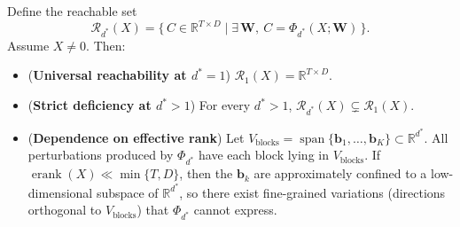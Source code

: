 \documentclass[sigconf,screen]{acmart}
\begin{document}
\begin{theorem}
\label{thm:expressivity}
Define the reachable set
\[
\mathcal R_{d^{\ast}}(X)
=\bigl\{\,C\in\mathbb R^{T\times D}\mid \exists\,\mathbf W,\ 
C=\Phi_{d^{\ast}}(X;\mathbf W)\,\bigr\}.
\]
Assume \(X\neq 0\). Then:
\begin{itemize}[leftmargin=15pt,parsep=2pt,itemsep=2pt,topsep=2pt]
  \item[(i)] (\textbf{Universal reachability at \(d^{\ast}=1\)}) \(\mathcal R_1(X)=\mathbb R^{T\times D}\).
  \item[(ii)] (\textbf{Strict deficiency at \(d^{\ast}>1\)}) For every \(d^{\ast}>1\), \(\mathcal R_{d^{\ast}}(X)\subsetneq\mathcal R_1(X)\).
  \item[(iii)] (\textbf{Dependence on effective rank}) Let \(V_{\mathrm{blocks}}=\operatorname{span}\{\mathbf b_1,\dots,\mathbf b_K\}\subset\mathbb R^{d^{\ast}}\). All perturbations produced by \(\Phi_{d^{\ast}}\) have each block lying in \(V_{\mathrm{blocks}}\). If \(\operatorname{erank}(X)\ll\min\{T,D\}\), then the \(\mathbf b_k\) are approximately confined to a low-dimensional subspace of \(\mathbb R^{d^{\ast}}\), so there exist fine-grained variations (directions orthogonal to \(V_{\mathrm{blocks}}\)) that \(\Phi_{d^{\ast}}\) cannot express.
\end{itemize}
\end{theorem}
\end{document}
